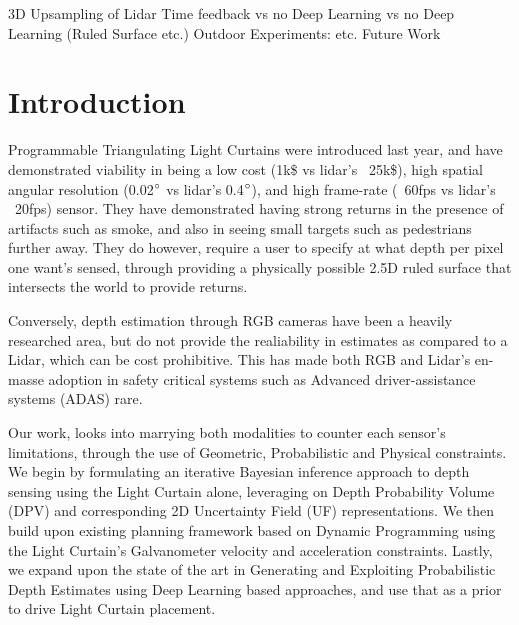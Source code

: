 \documentclass[review]{cvpr}
\begin{document}
      3D Upsampling of Lidar
      Time feedback vs no
      Deep Learning vs no Deep Learning (Ruled Surface etc.)
Outdoor Experiments:
   etc.
Future Work
\fi


\section{Introduction}

Programmable Triangulating Light Curtains were introduced last year, and have demonstrated viability in being a low cost (1k\$ vs lidar's ~25k\$), high spatial angular resolution (0.02$\degree$ vs lidar's  0.4$\degree$), and high frame-rate (~60fps vs lidar's ~20fps) sensor. They have demonstrated having strong returns in the presence of artifacts such as smoke, and also in seeing small targets such as pedestrians further away. They do however, require a user to specify at what depth per pixel one want's sensed, through providing a physically possible 2.5D ruled surface that intersects the world to provide returns. 

Conversely, depth estimation through RGB cameras have been a heavily researched area, but do not provide the realiability in estimates as compared to a Lidar, which can be cost prohibitive. This has made both RGB and Lidar's en-masse adoption in safety critical systems such as Advanced driver-assistance systems (ADAS) rare. 

Our work, looks into marrying both modalities to counter each sensor's limitations, through the use of Geometric, Probabilistic and Physical constraints. We begin by formulating an iterative Bayesian inference approach to depth sensing using the Light Curtain alone, leveraging on Depth Probability Volume (DPV) and corresponding 2D Uncertainty Field (UF) representations. We then build upon existing planning framework based on Dynamic Programming using the Light Curtain's Galvanometer velocity and acceleration constraints. Lastly, we expand upon the state of the art in Generating and Exploiting Probabilistic Depth Estimates using Deep Learning based approaches, and use that as a prior to drive Light Curtain placement.






{\small


}
\end{document}
